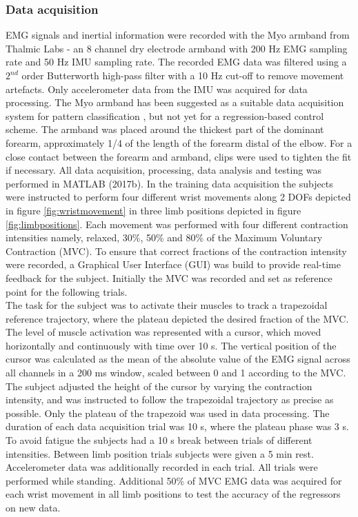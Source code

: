 \begin{multicols}{2}
\subsubsection*{Data acquisition}
EMG signals and inertial information were recorded with the Myo armband from Thalmic Labs - an 8 channel dry electrode armband with 200 Hz EMG sampling rate and 50 Hz IMU sampling rate. The recorded EMG data was filtered using a $2^{nd}$ order Butterworth high-pass filter with a 10 Hz cut-off to remove movement artefacts. Only accelerometer data from the IMU was acquired for data processing. The Myo armband has been suggested as a suitable data acquisition system for pattern classification \cite{Mendez2017}, but not yet for a regression-based control scheme. 
The armband was placed around the thickest part of the dominant forearm, approximately 1/4 of the length of the forearm distal of the elbow. For a close contact between the forearm and armband, clips were used to tighten the fit if necessary. All data acquisition, processing, data analysis and testing was performed in MATLAB (2017b).
In the training data acquisition the subjects were instructed to perform four different wrist movements along 2 DOFs depicted in figure \ref{fig:wristmovement} in three limb positions depicted in figure \ref{fig:limbpositions}. Each movement was performed with four different contraction intensities namely, relaxed, 30\%, 50\% and 80\% of the Maximum Voluntary Contraction (MVC). To ensure that correct fractions of the contraction intensity were recorded, a Graphical User Interface (GUI) was build to provide real-time feedback for the subject. Initially the MVC was recorded and set as reference point for the following trials. \\
The task for the subject was to activate their muscles to track a trapezoidal reference trajectory, where the plateau depicted the desired fraction of the MVC. The level of muscle activation was represented with a cursor, which moved horizontally and continuously with time over 10 s. The vertical position of the cursor was calculated as the mean of the absolute value of the EMG signal across all channels in a 200 ms window, scaled between 0 and 1 according to the MVC. The subject adjusted the height of the cursor by varying the contraction intensity, and was instructed to follow the trapezoidal trajectory as precise as possible. Only the plateau of the trapezoid was used in data processing. The duration of each data acquisition trial was 10 s, where the plateau phase was 3 s. To avoid fatigue the subjects had a 10 s break between trials of different intensities. Between limb position trials subjects were given a 5 min rest. Accelerometer data was additionally recorded in each trial. All trials were performed while standing.
Additional 50\% of MVC EMG data was acquired for each wrist movement in all limb positions to test the accuracy of the regressors on new data. 


\end{multicols}
